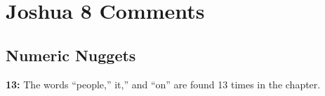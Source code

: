 \section{Joshua 8 Comments}

\subsection{Numeric Nuggets}
\textbf{13: } The words ``people,'' it,'' and ``on'' are found 13 times in the chapter.

